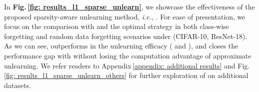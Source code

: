 {%
\fi
In \textbf{Fig.\,\ref{fig: results_l1_sparse_unlearn}},
we   showcase the effectiveness of the proposed sparsity-aware unlearning method, \textit{i.e.}, {\MUSparse}. 
For ease of presentation, we focus on the comparison with  {\FT} and the optimal {\retrain}  strategy in both class-wise forgetting and random data forgetting  scenarios under (CIFAR-10, ResNet-18). As we can see, {\MUSparse}  outperforms {\FT} in  the unlearning efficacy ({\UA} and {\MIAF}), and closes the performance gap with {\retrain}  without losing the computation advantage of approximate unlearning. We refer readers to Appendix\,\ref{appendix: additional results} and Fig.\,\ref{fig: results_l1_sparse_unlearn_others} for further exploration of {\MUSparse} on additional datasets.




\iffalse
\fi










}
